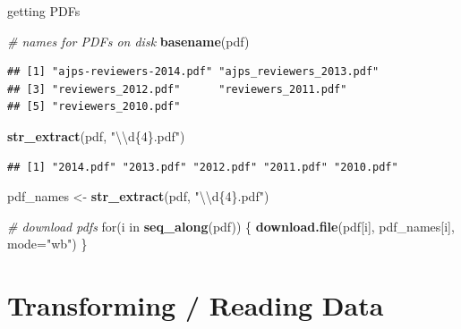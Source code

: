 \documentclass[ignorenonframetext,]{beamer}
\newenvironment{Shaded}{\begin{snugshade}}{\end{snugshade}}
\newcommand{\KeywordTok}[1]{\textcolor[rgb]{0.13,0.29,0.53}{\textbf{{#1}}}}
\newcommand{\DataTypeTok}[1]{\textcolor[rgb]{0.13,0.29,0.53}{{#1}}}
\newcommand{\CharTok}[1]{\textcolor[rgb]{0.31,0.60,0.02}{{#1}}}
\newcommand{\StringTok}[1]{\textcolor[rgb]{0.31,0.60,0.02}{{#1}}}
\newcommand{\CommentTok}[1]{\textcolor[rgb]{0.56,0.35,0.01}{\textit{{#1}}}}
\newcommand{\NormalTok}[1]{{#1}}
\begin{document}
\begin{frame}[fragile]{getting PDFs}

\begin{Shaded}
\begin{Highlighting}[]
\CommentTok{# names for PDFs on disk}
\KeywordTok{basename}\NormalTok{(pdf)}
\end{Highlighting}
\end{Shaded}

\begin{verbatim}
## [1] "ajps-reviewers-2014.pdf" "ajps_reviewers_2013.pdf"
## [3] "reviewers_2012.pdf"      "reviewers_2011.pdf"     
## [5] "reviewers_2010.pdf"
\end{verbatim}

\begin{Shaded}
\begin{Highlighting}[]
\KeywordTok{str_extract}\NormalTok{(pdf, }\StringTok{"}\CharTok{\textbackslash{}\textbackslash{}}\StringTok{d\{4\}.pdf"}\NormalTok{)}
\end{Highlighting}
\end{Shaded}

\begin{verbatim}
## [1] "2014.pdf" "2013.pdf" "2012.pdf" "2011.pdf" "2010.pdf"
\end{verbatim}

\begin{Shaded}
\begin{Highlighting}[]
\NormalTok{pdf_names <-}\StringTok{ }\KeywordTok{str_extract}\NormalTok{(pdf, }\StringTok{"}\CharTok{\textbackslash{}\textbackslash{}}\StringTok{d\{4\}.pdf"}\NormalTok{)}
\end{Highlighting}
\end{Shaded}

\begin{Shaded}
\begin{Highlighting}[]
\CommentTok{# download pdfs}
\NormalTok{for(i in }\KeywordTok{seq_along}\NormalTok{(pdf)) \{}
  \KeywordTok{download.file}\NormalTok{(pdf[i], pdf_names[i], }\DataTypeTok{mode=}\StringTok{"wb"}\NormalTok{)}
\NormalTok{\}}
\end{Highlighting}
\end{Shaded}

\end{frame}

\section{Transforming / Reading Data}\label{transforming-reading-data}
\end{document}
